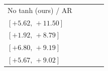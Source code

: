 \begin{table}[t]
\begin{tabular}{@{}lrrrr@{}}
No tanh (ours) / AR & \shortstack[r]{$\textcolor{gainpositive}{\mathbf{+8.51}}$\\$[+5.62,\,+11.50]$} & \shortstack[r]{$\textcolor{gainpositive}{\mathbf{+5.51}}$\\$[+1.92,\,+8.79]$} & \shortstack[r]{$\textcolor{gainpositive}{\mathbf{+7.97}}$\\$[+6.80,\,+9.19]$} & \shortstack[r]{$\textcolor{gainpositive}{\mathbf{+7.33}}$\\$[+5.67,\,+9.02]$} \\[3pt]
\bottomrule\end{tabular}\endgroup\end{table}
